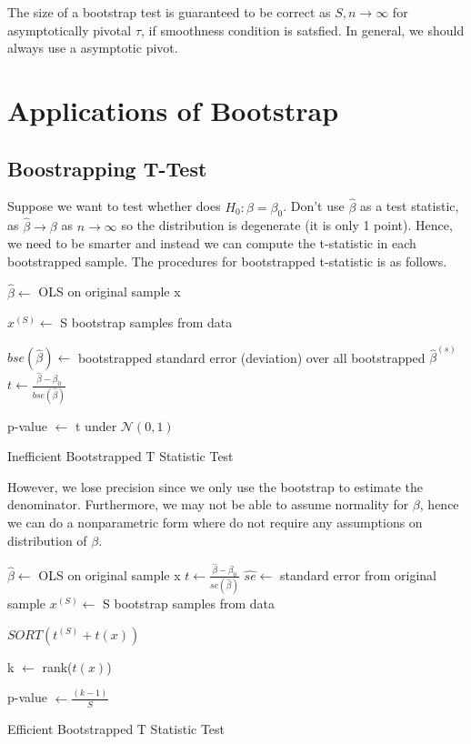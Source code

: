 \documentclass[twoside]{article}
\begin{document}
The size of a bootstrap test is guaranteed to be correct as $S, n \rightarrow \infty$ for asymptotically pivotal $\tau$, if smoothness condition is satsfied. In general, we should always use a asymptotic pivot.

\section{Applications of Bootstrap}
\subsection{Boostrapping T-Test}
Suppose we want to test whether does $H_0: \beta = \beta_0$. Don't use $\hat{\beta}$ as a test statistic, as $\hat{\beta} \rightarrow \beta$ as $n \rightarrow \infty$ so the distribution is degenerate (it is only 1 point). Hence, we need to be smarter and instead we can compute the t-statistic in each bootstrapped sample. The procedures for bootstrapped t-statistic is as follows.

\begin{algorithm}
\DontPrintSemicolon
{}

$\hat{\beta} \gets$ OLS on original sample x \; 


$x^{(S)} \gets$ S bootstrap samples from data\;

$bse(\hat{\beta}) \gets$ bootstrapped standard error (deviation) over all bootstrapped $\hat{\beta}^{(s)}$\;
$t \gets \frac{\hat{\beta} - \beta_0}{bse(\hat{\beta})}$ \;

p-value $\gets $ t under $\mathcal{N}(0,1)$\; 

\caption{{\sc Inefficient Bootstrapped T Statistic Test}}
\label{algo:duplicate}
\end{algorithm}

However, we lose precision since we only use the bootstrap to estimate the denominator. Furthermore, we may not be able to assume normality for $\beta$, hence we can do a nonparametric form where do not require any assumptions on distribution of $\beta$.

\begin{algorithm}
\DontPrintSemicolon
{}

$\hat{\beta} \gets$ OLS on original sample x \; 
$t \gets \frac{\hat{\beta} - \beta_0}{se(\hat{\beta})}$ \;
$\hat{se} \gets$ standard error from original sample\; 
$x^{(S)} \gets$ S bootstrap samples from data\;


$SORT(t^{(S)} + t(x))$\;

k $\gets$ rank($t(x)$)

p-value $\gets \frac{(k-1)}{S}$ 

\caption{{\sc Efficient Bootstrapped T Statistic Test}}
\label{algo:duplicate}
\end{algorithm}
\end{document}
